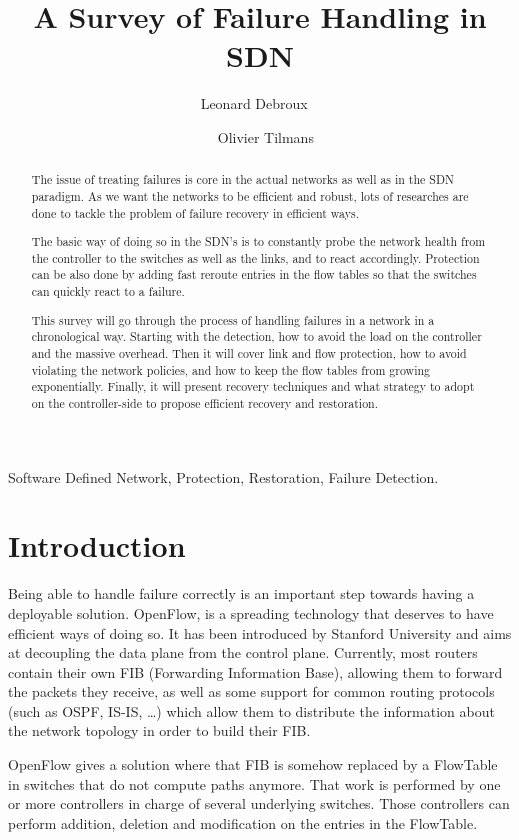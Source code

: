 \documentclass[final]{IEEEtran}
\author{Leonard Debroux ~\and~ Olivier Tilmans\\
\IEEEauthorblockA{
  EPL, UCL\\
  Louvain-la-Neuve, Belgium\\
  \{leonard.debroux, olivier.tilmans\}@student.uclouvain.be
}}
\title{A Survey of Failure Handling in SDN}
\begin{document}
\maketitle
\begin{abstract}
The issue of treating failures is core in the actual networks as well as in the SDN paradigm. As we want the networks to be efficient and robust, lots of researches are done to tackle the problem of failure recovery in efficient ways.

The basic way of doing so in the SDN's is to constantly probe the network health from the controller to the switches as well as the links, and to react accordingly. Protection can be also done by adding fast reroute entries in the flow tables so that the switches can quickly react to a failure.

This survey will go through the process of handling failures in a network in a chronological way. Starting with the detection, how to avoid the load on the controller and the massive overhead. Then it will cover link and flow protection, how to avoid violating the network policies, and how to keep the flow tables from growing exponentially. Finally, it will present recovery techniques and what strategy to adopt on the controller-side to propose efficient recovery and restoration.
\end{abstract}

\begin{IEEEkeywords}
Software Defined Network, Protection, Restoration, Failure Detection.
\end{IEEEkeywords}

\section{Introduction}
Being able to handle failure correctly is an important step towards having a deployable solution. OpenFlow, is a spreading technology that deserves to have efficient ways of doing so. It has been introduced by Stanford University and aims at decoupling the data plane from the control plane. Currently, most routers contain their own FIB (Forwarding Information Base), allowing them to forward the packets they receive, as well as some support for common routing protocols (such as OSPF, IS-IS, \ldots) which allow them to distribute the information about the network topology in order to build their FIB.

OpenFlow gives a solution where that FIB is somehow replaced by a FlowTable in switches that do not compute paths anymore. That work is performed by one or more controllers in charge of several underlying switches. Those controllers can perform addition, deletion and modification on the entries in the FlowTable.
\end{document}
